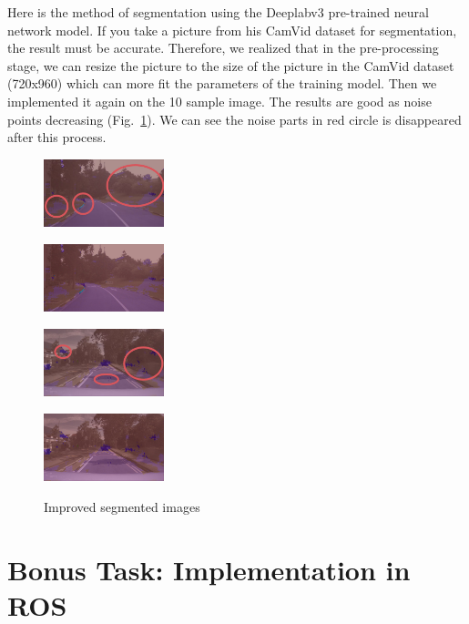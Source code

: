 \documentclass[10pt]{article}
\theoremstyle{nonumberplain}
\begin{document}
Here is the method of segmentation using the Deeplabv3 pre-trained neural network model. If you take a picture from his CamVid dataset for segmentation, the result must be accurate. Therefore, we realized that in the pre-processing stage, we can resize the picture to the size of the picture in the CamVid dataset (720x960) which can more fit the parameters of the training model. Then we implemented it again on the 10 sample image. The results are good as noise points decreasing (Fig.~\ref{fig7}). We can see the noise parts in red circle is disappeared after this process.

\begin{figure}[H]
	\centering
	\begin{minipage}[t]{0.24\textwidth}
		\centering
		\includegraphics[width=3.5cm]{fig7a.jpg}
		\label{fig7a}
	\end{minipage}
	\begin{minipage}[t]{0.24\textwidth}
		\centering
		\includegraphics[width=3.5cm]{fig7b.jpg}
		\label{fig7b}
	\end{minipage}
	\begin{minipage}[t]{0.24\textwidth}
		\centering
		\includegraphics[width=3.5cm]{fig7c.jpg}
		\label{fig7c}
	\end{minipage}
	\begin{minipage}[t]{0.24\textwidth}
		\centering
		\includegraphics[width=3.5cm]{fig7d.jpg}
		\label{fig7d}
	\end{minipage}
	\caption{Improved segmented images}
	\label{fig7}
\end{figure}



\section{Bonus Task: Implementation in ROS}

\hspace{1.0em}














	
\end{document}
